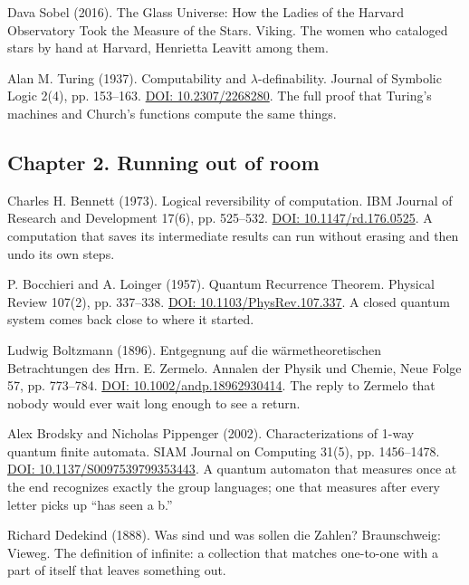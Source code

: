 \documentclass[11pt,twoside]{article}
\theoremstyle{thielethm}
\theoremstyle{thieledef}
\theoremstyle{thieledef}
\theoremstyle{thieledef}
\theoremstyle{thielethm}
\theoremstyle{thieleobs}
\theoremstyle{thielethm}
\begin{document}
\noindent Dava Sobel (2016). The Glass Universe: How the Ladies of the Harvard Observatory Took the Measure of the Stars. Viking. The women who cataloged stars by hand at Harvard, Henrietta Leavitt among them.
\par\medskip

\noindent Alan M. Turing (1937). Computability and $\lambda$-definability. Journal of Symbolic Logic 2(4), pp. 153--163. \href{https://doi.org/10.2307/2268280}{DOI: 10.2307/2268280}. The full proof that Turing's machines and Church's functions compute the same things.
\par\medskip

\subsection*{Chapter 2. Running out of room}

\noindent Charles H. Bennett (1973). Logical reversibility of computation. IBM Journal of Research and Development 17(6), pp. 525--532. \href{https://doi.org/10.1147/rd.176.0525}{DOI: 10.1147/rd.176.0525}. A computation that saves its intermediate results can run without erasing and then undo its own steps.
\par\medskip

\noindent P. Bocchieri and A. Loinger (1957). Quantum Recurrence Theorem. Physical Review 107(2), pp. 337--338. \href{https://doi.org/10.1103/PhysRev.107.337}{DOI: 10.1103/PhysRev.107.337}. A closed quantum system comes back close to where it started.
\par\medskip

\noindent Ludwig Boltzmann (1896). Entgegnung auf die w\"armetheoretischen Betrachtungen des Hrn. E. Zermelo. Annalen der Physik und Chemie, Neue Folge 57, pp. 773--784. \href{https://doi.org/10.1002/andp.18962930414}{DOI: 10.1002/andp.18962930414}. The reply to Zermelo that nobody would ever wait long enough to see a return.
\par\medskip

\noindent Alex Brodsky and Nicholas Pippenger (2002). Characterizations of 1-way quantum finite automata. SIAM Journal on Computing 31(5), pp. 1456--1478. \href{https://doi.org/10.1137/S0097539799353443}{DOI: 10.1137/S0097539799353443}. A quantum automaton that measures once at the end recognizes exactly the group languages; one that measures after every letter picks up ``has seen a b.''
\par\medskip

\noindent Richard Dedekind (1888). Was sind und was sollen die Zahlen? Braunschweig: Vieweg. The definition of infinite: a collection that matches one-to-one with a part of itself that leaves something out.
\par\medskip
\end{document}

